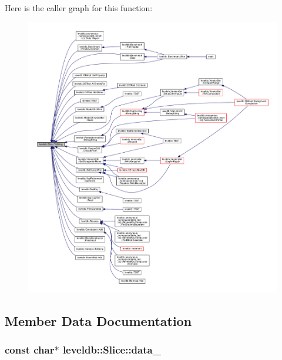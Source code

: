 Here is the caller graph for this function\+:
\nopagebreak
\begin{figure}[H]
\begin{center}
\leavevmode
\includegraphics[width=350pt]{classleveldb_1_1_slice_a2cdd9fb649105033fde510afc9416732_icgraph}
\end{center}
\end{figure}




\subsection{Member Data Documentation}
\hypertarget{classleveldb_1_1_slice_a5c5f7e46f1dfaf661d6888a5460e8aa8}{}
\subsubsection[{data\+\_\+}]{\setlength{\rightskip}{0pt plus 5cm}const char$\ast$ leveldb\+::\+Slice\+::data\+\_\+\hspace{0.3cm}{\ttfamily [private]}}\label{classleveldb_1_1_slice_a5c5f7e46f1dfaf661d6888a5460e8aa8}
\hypertarget{classleveldb_1_1_slice_a5df3db41919d1700c5e8d95f0e40d1ca}{}
